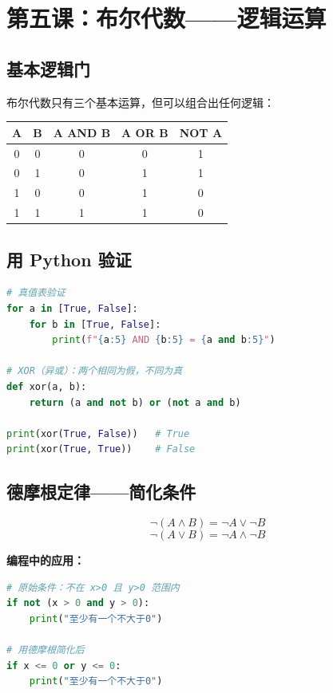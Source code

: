 \documentclass[a4paper,12pt]{ctexart}
\begin{document}
\section*{第五课：布尔代数——逻辑运算}

\subsection*{基本逻辑门}

布尔代数只有三个基本运算，但可以组合出任何逻辑：

\begin{center}
\begin{tabular}{|c|c|c|c|c|}
\hline
\textbf{A} & \textbf{B} & \textbf{A AND B} & \textbf{A OR B} & \textbf{NOT A} \\ \hline
0 & 0 & 0 & 0 & 1 \\ \hline
0 & 1 & 0 & 1 & 1 \\ \hline
1 & 0 & 0 & 1 & 0 \\ \hline
1 & 1 & 1 & 1 & 0 \\ \hline
\end{tabular}
\end{center}

\subsection*{用 Python 验证}

\begin{lstlisting}[language=Python]
# 真值表验证
for a in [True, False]:
    for b in [True, False]:
        print(f"{a:5} AND {b:5} = {a and b:5}")
        
# XOR（异或）：两个相同为假，不同为真
def xor(a, b):
    return (a and not b) or (not a and b)

print(xor(True, False))   # True
print(xor(True, True))    # False
\end{lstlisting}

\subsection*{德摩根定律——简化条件}

\[
\lnot (A \land B) = \lnot A \lor \lnot B
\]
\[
\lnot (A \lor B) = \lnot A \land \lnot B
\]

\textbf{编程中的应用：}

\begin{lstlisting}[language=Python]
# 原始条件：不在 x>0 且 y>0 范围内
if not (x > 0 and y > 0):
    print("至少有一个不大于0")

# 用德摩根简化后
if x <= 0 or y <= 0:
    print("至少有一个不大于0")
\end{lstlisting}
\end{document}
